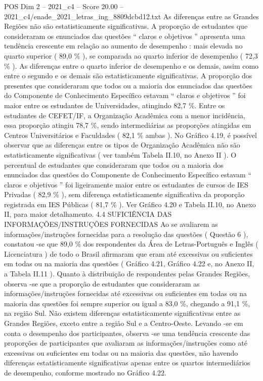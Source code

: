 \begin{textsample}{POS Dim 2 – 2021\_c4 – Score 20.00 – 2021\_c4/enade\_2021\_letras\_ing\_8809dcbd12.txt}
As diferenças entre as Grandes Regiões não são estatisticamente significativas.
A proporção de estudantes que consideraram os enunciados das questões “ claros e objetivos ” apresenta uma tendência crescente em relação ao aumento de desempenho : mais elevada no quarto superior ( 89,0 \% ), se comparada ao quarto inferior de desempenho ( 72,3 \% ).
As diferenças entre o quarto inferior de desempenho e os demais, assim como entre o segundo e os demais são estatisticamente significativas.
A proporção dos presentes que consideraram que todos ou a maioria dos enunciados das questões do Componente de Conhecimento Específico estavam “ claros e objetivos ” foi maior entre os estudantes de Universidades, atingindo 82,7 \%.
Entre os estudantes de CEFET/IF, a Organização Acadêmica com a menor incidência, essa proporção atingiu 78,7 \%, sendo intermediárias as proporções atingidas em Centros Universitários e Faculdades ( 82,1 \% ambas ).
No Gráfico 4.19, é possível observar que as diferenças entre os tipos de Organização Acadêmica não são estatisticamente significativas ( ver também Tabela II.10, no Anexo II ).
O percentual de estudantes que consideraram que todos ou a maioria dos enunciados das questões do Componente de Conhecimento Específico estavam “ claros e objetivos ” foi ligeiramente maior entre os estudantes de cursos de IES Privadas ( 82,9 \% ), sem diferença estatisticamente significativa da proporção registrada em IES Públicas ( 81,7 \% ).
Ver Gráfico 4.20 e Tabela II.10, no Anexo II, para maior detalhamento. 4.4 SUFICIÊNCIA DAS INFORMAÇÕES/INSTRUÇÕES FORNECIDAS Ao se avaliarem as informações/instruções fornecidas para a resolução das questões ( Questão 6 ), constatou -se que 89,0 \% dos respondentes da Área de Letras-Português e Inglês ( Licenciatura ) de todo o Brasil afirmaram que eram até excessivas ou suficientes em todas ou na maioria das questões ( Gráfico 4.21, Gráfico 4.22 e, no Anexo II, a Tabela II.11 ).
Quanto à distribuição de respondentes pelas Grandes Regiões, observa -se que a proporção de estudantes que consideraram as informações/instruções fornecidas até excessivas ou suficientes em todas ou na maioria das questões foi sempre superior ou igual a 83,0 \%, chegando a 91,1 \%, na região Sul.
Não existem diferenças estatisticamente significativas entre as Grandes Regiões, exceto entre a região Sul e a Centro-Oeste.
Levando -se em conta o desempenho dos participantes, observa -se uma tendência crescente das proporções de participantes que avaliaram as informações/instruções como até excessivas ou suficientes em todas ou na maioria das questões, não havendo diferenças estatisticamente significativas apenas entre os quartos intermediários de desempenho, conforme mostrado no Gráfico 4.22.

\end{textsample}

